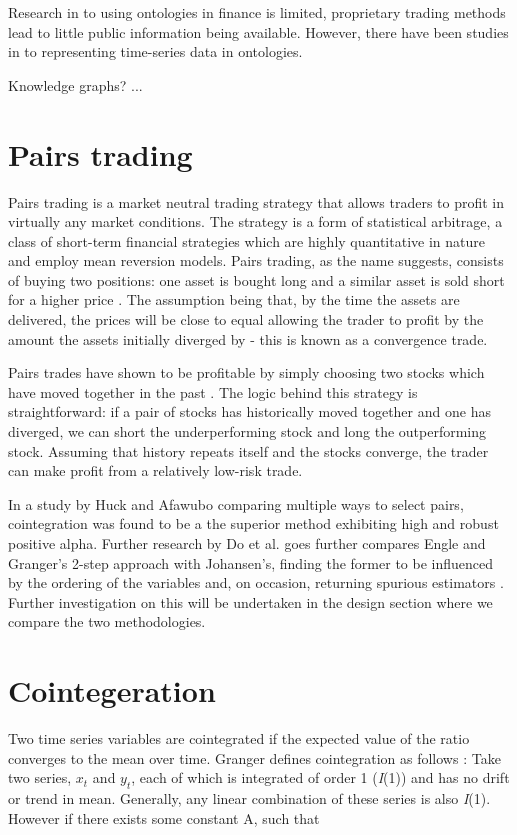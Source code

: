 \documentclass{UoYCSproject}
\begin{document}
Research in to using ontologies in finance is limited, proprietary trading methods lead to little public information being available. However, there have been studies in to representing time-series data in ontologies. 

Knowledge graphs? ...

\section{Pairs trading}

Pairs trading is a market neutral trading strategy that allows traders to profit in virtually any market conditions. The strategy is a form of statistical arbitrage, a class of short-term financial strategies which are highly quantitative in nature and employ mean reversion models. Pairs trading, as the name suggests, consists of buying two positions: one asset is bought long and a similar asset is sold short for a higher price \parencite{pairsdesc}. The assumption being that, by the time the assets are delivered, the prices will be close to equal allowing the trader to profit by the amount the assets initially diverged by - this is known as a convergence trade.

Pairs trades have shown to be profitable by simply choosing two stocks which have moved together in the past \parencite{pairshistory}. The logic behind this strategy is straightforward: if a pair of stocks has historically moved together and one has diverged, we can short the underperforming stock and long the outperforming stock. Assuming that history repeats itself and the stocks converge, the trader can make profit from a relatively low-risk trade.

In a study by Huck and Afawubo \parencite{cointsupport} comparing multiple ways to select pairs, cointegration was found to be a the superior method exhibiting high and robust positive alpha. Further research by Do et al. goes further compares Engle and Granger’s 2-step approach with Johansen’s, finding the former to be influenced by the ordering of the variables and, on occasion, returning spurious estimators \parencite{cointcompared}. Further investigation on this will be undertaken in the design section where we compare the two methodologies.

\section{Cointegeration}

Two time series variables are cointegrated if the expected value of the ratio converges to the mean over time. Granger defines cointegration as follows \parencite{cointdef}:
Take two series, $x_{t}$ and $y_{t}$, each of which is integrated of order 1 (\emph{I}(1)) and has no drift or trend in mean. Generally, any linear combination of these series is also \emph{I}(1). However if there exists some constant A, such that
\end{document}
